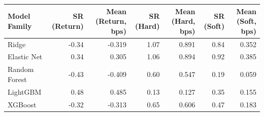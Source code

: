 \begin{tabular}{lrrrrrr}
\toprule
Model Family & SR (Return) & Mean (Return, bps) & SR (Hard) & Mean (Hard, bps) & SR (Soft) & Mean (Soft, bps) \\
\midrule
Ridge & -0.34 & -0.319 & 1.07 & 0.891 & 0.84 & 0.352 \\
Elastic Net & 0.34 & 0.305 & 1.06 & 0.894 & 0.92 & 0.385 \\
Random Forest & -0.43 & -0.409 & 0.60 & 0.547 & 0.19 & 0.059 \\
LightGBM & 0.48 & 0.485 & 0.13 & 0.127 & 0.35 & 0.155 \\
XGBoost & -0.32 & -0.313 & 0.65 & 0.606 & 0.47 & 0.183 \\
\bottomrule
\end{tabular}
